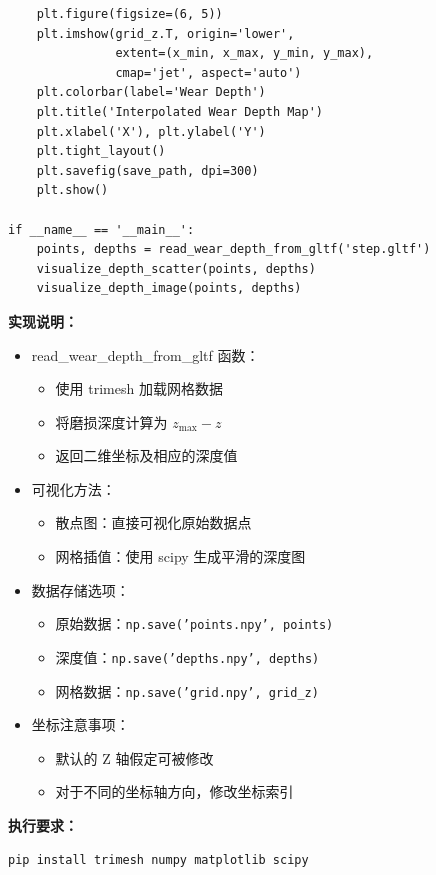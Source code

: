 \documentclass[11pt,a4paper]{ctexart}
\begin{document}
\begin{lstlisting}
    plt.figure(figsize=(6, 5))
    plt.imshow(grid_z.T, origin='lower',
               extent=(x_min, x_max, y_min, y_max),
               cmap='jet', aspect='auto')
    plt.colorbar(label='Wear Depth')
    plt.title('Interpolated Wear Depth Map')
    plt.xlabel('X'), plt.ylabel('Y')
    plt.tight_layout()
    plt.savefig(save_path, dpi=300)
    plt.show()

if __name__ == '__main__':
    points, depths = read_wear_depth_from_gltf('step.gltf')
    visualize_depth_scatter(points, depths)
    visualize_depth_image(points, depths)
\end{lstlisting}

\noindent\textbf{实现说明：}

\begin{itemize}[itemsep=2pt,topsep=2pt]
\item read\_wear\_depth\_from\_gltf 函数：
  \begin{itemize}
  \item 使用 trimesh 加载网格数据
  \item 将磨损深度计算为 $z_{\max}-z$
  \item 返回二维坐标及相应的深度值
  \end{itemize}
\item 可视化方法：
  \begin{itemize}
  \item 散点图：直接可视化原始数据点
  \item 网格插值：使用 scipy 生成平滑的深度图
  \end{itemize}
\item 数据存储选项：
  \begin{itemize}
  \item 原始数据：\texttt{np.save('points.npy', points)}
  \item 深度值：\texttt{np.save('depths.npy', depths)}
  \item 网格数据：\texttt{np.save('grid.npy', grid\_z)}
  \end{itemize}
\item 坐标注意事项：
  \begin{itemize}
  \item 默认的 Z 轴假定可被修改
  \item 对于不同的坐标轴方向，修改坐标索引
  \end{itemize}
\end{itemize}

\noindent\textbf{执行要求：}

\begin{lstlisting}
pip install trimesh numpy matplotlib scipy
\end{lstlisting}
\end{document}
